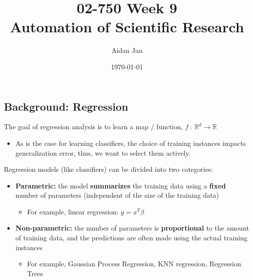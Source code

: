 \documentclass[10pt]{article}
\title{02-750 Week 9 \\ \large{Automation of Scientific Research}}
\author{Aidan Jan}
\date{\today}
\begin{document}
\maketitle

\subsection*{Background: Regression}
The goal of regression analysis is to learn a map / function, $f \::\: \mathbb{R}^d \rightarrow \mathbb{R}$
\begin{itemize}
	\item As is the case for learning classifiers, the choice of training instances impacts generalization error, thus, we want to select them actively.
\end{itemize}
Regression models (like classifiers) can be divided into two categories:
\begin{itemize}
	\item \textbf{Parametric:} the model \textbf{summarizes} the training data using a \textbf{fixed} number of parameters (independent of the size of the training data)
	\begin{itemize}
	    \item For example, linear regression: $y = x^T \beta$
    \end{itemize}
    \item \textbf{Non-parametric:} the number of parameters is \textbf{proportional} to the amount of training data, and the predictions are often made using the actual training instances
    \begin{itemize}
	    \item For example, Gaussian Process Regression, KNN regression, Regression Trees
    \end{itemize}   
\end{itemize}
\end{document}
